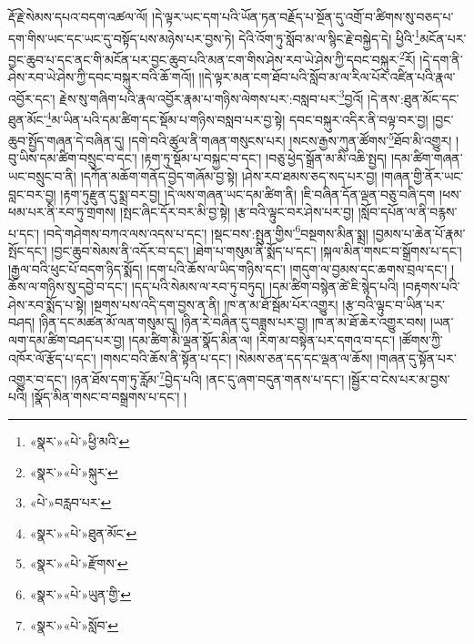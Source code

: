 རྡོ་རྗེ་སེམས་དཔའ་བདག་འཚལ་ལོ། །དེ་ལྟར་ཡང་དག་པའི་ཡོན་ཏན་བརྗོད་པ་སྔོན་དུ་འགྲོ་བ་ཚིགས་སུ་བཅད་པ་དག་གིས་ཡང་དང་ཡང་དུ་བསྟོད་པས་མཉེས་པར་བྱས་ཏེ། དེའི་འོག་ཏུ་སློབ་མ་ལ་སྙིང་རྗེ་བསྐྱེད་དེ། ཕྱིའི་\footnote{«སྣར་»«པེ་»ཕྱི་མའི་}མངོན་པར་བྱང་ཆུབ་པ་དང་ནང་གི་མངོན་པར་བྱང་ཆུབ་པའི་མན་ངག་གིས་ཤེས་རབ་ཡེ་ཤེས་ཀྱི་དབང་བསྐུར་\footnote{«སྣར་»«པེ་»སྐུར་}རོ། །དེ་དག་ནི་ཤེས་རབ་ཡེ་ཤེས་ཀྱི་དབང་བསྐུར་བའི་ཆོ་གའོ།། །།དེ་ལྟར་མན་ངག་ཐོབ་པའི་སློབ་མ་ལ་རིལ་པོར་འཛིན་པའི་རྣལ་འབྱོར་དང་། རྗེས་སུ་གཞིག་པའི་རྣལ་འབྱོར་རྣམ་པ་གཉིས་ལེགས་པར་:བསླབ་པར་\footnote{«པེ་»བརླབ་པར་}བྱའོ། །དེ་ནས་:ཐུན་མོང་དང་ཐུན་མོང་\footnote{«སྣར་»«པེ་»ཐུན་མོང་}མ་ཡིན་པའི་དམ་ཚིག་དང་སྡོམ་པ་གཉིས་བསླབ་པར་བྱ་སྟེ། དབང་བསྐུར་འདིར་ནི་བལྟ་བར་བྱ། །བྱང་ཆུབ་སྤྱོད་གཞན་དེ་བཞིན་དུ། །དགེ་བའི་ཚུལ་ནི་གཞན་གསུངས་པར། །སངས་རྒྱས་ཀུན་ཚོགས་\footnote{«སྣར་»«པེ་»རྫོགས་}ཐོབ་མི་འགྱུར། །བུ་ཡིས་དམ་ཚིག་བསྲུང་བ་དང་། །རྟག་ཏུ་སྡོམ་པ་བསྐྱང་བ་དང་། །བཅུ་ཕྱེད་སྒྲོན་མ་མི་འཆི་སྤྱད། །དམ་ཚིག་གཞན་ཡང་བསྲུང་བ་ནི། །དཀོན་མཆོག་གནོད་བྱེད་གཞོམ་བྱ་སྟེ། །ཤེས་རབ་ཐམས་ཅད་སད་པར་བྱ། །གཞན་གྱི་ནོར་ཡང་བླང་བར་བྱ། །རྟག་ཏུརྫུན་དུ་སྨྲ་བར་བྱ། །དེ་ལས་གཞན་ཡང་དམ་ཚིག་ནི། །ཇི་བཞིན་དོན་ལྡན་བཅུ་བཞི་དག །ཕས་ཕམ་པར་ནི་རབ་ཏུ་གྲགས། །སྤང་ཞིང་དོར་བར་མི་བྱ་སྟེ། །རྩ་བའི་ལྟུང་བར་ཤེས་པར་བྱ། །སློབ་དཔོན་ལ་ནི་བརྙས་པ་དང་། །བདེ་གཤེགས་བཀའ་ལས་འདས་པ་དང་། །སྡང་བས་:སྤུན་གྱིས་\footnote{«སྣར་»«པེ་»ཡུན་གྱི་}བསྔགས་མིན་སྨྲ། །བྱམས་པ་ཆེན་པོ་རྣམ་སྤོང་དང་། །བྱང་ཆུབ་སེམས་ནི་འདོར་བ་དང་། །ཐེག་པ་གསུམ་ནི་སྨོད་པ་དང་། །སྐལ་མིན་གསང་བ་སྒྲོགས་པ་དང་། །རྒྱལ་བའི་ཕུང་པོ་བདག་ཉིད་སྨོད། །དག་པའི་ཆོས་ལ་ཡིད་གཉིས་དང་། །གདུག་ལ་བྱམས་དང་ཆགས་བྲལ་དང་། །ཆོས་ལ་གཉིས་སུ་དབྱེ་བ་དང་། །དད་པའི་སེམས་ལ་རབ་ཏུ་བཏུད། །དམ་ཚིག་བསྙེན་ཚེ་ཇི་སྙེད་པའི། །བརྟགས་པའི་ཤེས་རབ་སྨོད་པ་སྟེ། །སྔགས་པས་འདི་དག་བྱས་ན་ནི། །ཁ་ན་མ་ཐོ་སྦོམ་པོར་འགྱུར། །རྩ་བའི་ལྟུང་བ་ཡིན་པར་བཤད། །ཉིན་དང་མཚན་མོ་ལན་གསུམ་དུ། །ཉིན་རེ་བཞིན་དུ་བཟླས་པར་བྱ། །ཁ་ན་མ་ཐོ་ཆེར་འགྱུར་བས། །ཡན་ལག་དམ་ཚིག་བཤད་པར་བྱ། །དམ་ཚིག་མི་ལྡན་སྣོད་མིན་ལ། །རིག་མ་བསྟེན་པར་དགའ་བ་དང་། །ཚོགས་ཀྱི་འཁོར་ལོ་རྩོད་པ་དང་། །གསང་བའི་ཆོས་ནི་སྟོན་པ་དང་། །སེམས་ཅན་དད་དང་ལྡན་ལ་ཆོས། །གཞན་དུ་སྟོན་པར་འགྱུར་བ་དང་། །ཉན་ཐོས་དག་ཏུ་རློམ་\footnote{«སྣར་»«པེ་»སློབ་}བྱེད་པའི། །ནང་དུ་ཞག་བདུན་གནས་པ་དང་། །སྦྱོར་བ་ངེས་པར་མ་བྱས་པའི། །སྣོད་མིན་གསང་བ་བསྒྲགས་པ་དང་། །
